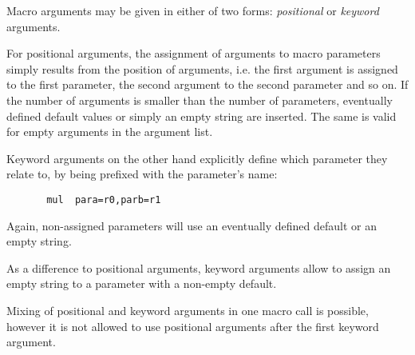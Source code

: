 \documentclass[12pt,twoside]{report}
\begin{document}
Macro arguments may be given in either of two forms: {\em
positional} or {\em keyword} arguments.

For positional arguments, the assignment of arguments to macro
parameters simply results from the position of arguments, i.e.
the first argument is assigned to the first parameter, the second
argument to the second parameter and so on.  If the number of
arguments is smaller than the number of parameters, eventually
defined default values or simply an empty string are inserted.
The same is valid for empty arguments in the argument list.

Keyword arguments on the other hand explicitly define which
parameter they relate to, by being prefixed with the parameter's
name:
\begin{verbatim}
       mul  para=r0,parb=r1
\end{verbatim}
Again, non-assigned parameters will use an eventually defined
default or an empty string.

As a difference to positional arguments, keyword arguments allow
to assign an empty string to a parameter with a non-empty
default.

Mixing of positional and keyword arguments in one macro call is
possible, however it is not allowed to use positional arguments
after the first keyword argument.
\end{document}
